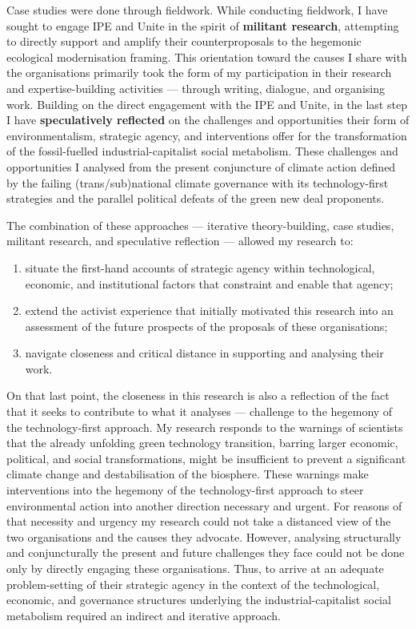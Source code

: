 \documentclass[a4paper, nobind]{templates/ociamthesis}
\begin{document}
Case studies were done through fieldwork. While conducting fieldwork, I have sought to engage IPE and Unite in the spirit of \textbf{militant research}, attempting to directly support and amplify their counterproposals to the hegemonic ecological modernisation framing. This orientation toward the causes I share with the organisations primarily took the form of my participation in their research and expertise-building activities --- through writing, dialogue, and organising work. Building on the direct engagement with the IPE and Unite, in the last step I have \textbf{speculatively reflected} on the challenges and opportunities their form of environmentalism, strategic agency, and interventions offer for the transformation of the fossil-fuelled industrial-capitalist social metabolism. These challenges and opportunities I analysed from the present conjuncture of climate action defined by the failing (trans/sub)national climate governance with its technology-first strategies and the parallel political defeats of the green new deal proponents.

The combination of these approaches --- iterative theory-building, case studies, militant research, and speculative reflection --- allowed my research to:

\begin{enumerate}
\def\labelenumi{\alph{enumi})}
\item
  situate the first-hand accounts of strategic agency within technological, economic, and institutional factors that constraint and enable that agency;
\item
  extend the activist experience that initially motivated this research into an assessment of the future prospects of the proposals of these organisations;
\item
  navigate closeness and critical distance in supporting and analysing their work.
\end{enumerate}

On that last point, the closeness in this research is also a reflection of the fact that it seeks to contribute to what it analyses --- challenge to the hegemony of the technology-first approach. My research responds to the warnings of scientists that the already unfolding green technology transition, barring larger economic, political, and social transformations, might be insufficient to prevent a significant climate change and destabilisation of the biosphere. These warnings make interventions into the hegemony of the technology-first approach to steer environmental action into another direction necessary and urgent. For reasons of that necessity and urgency my research could not take a distanced view of the two organisations and the causes they advocate. However, analysing structurally and conjuncturally the present and future challenges they face could not be done only by directly engaging these organisations. Thus, to arrive at an adequate problem-setting of their strategic agency in the context of the technological, economic, and governance structures underlying the industrial-capitalist social metabolism required an indirect and iterative approach.
\end{document}

